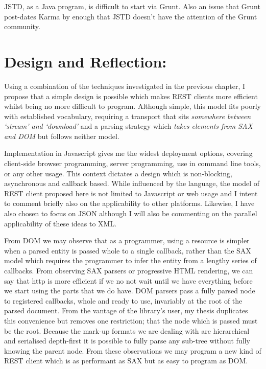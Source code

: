 \documentclass[]{article}
\let\stdsection\section
\renewcommand\section{\newpage\stdsection}
\begin{document}
JSTD, as a Java program, is difficult to start via Grunt. Also an issue
that Grunt post-dates Karma by enough that JSTD doesn't have the
attention of the Grunt community.

\section{Design and Reflection:}

Using a combination of the techniques investigated in the previous
chapter, I propose that a simple design is possible which makes REST
clients more efficient whilst being no more difficult to program.
Although simple, this model fits poorly with established vocabulary,
requiring a transport that sits \emph{somewhere between `stream' and
`download'} and a parsing strategy which \emph{takes elements from SAX
and DOM} but follows neither model.

Implementation in Javascript gives me the widest deployment options,
covering client-side browser programming, server programming, use in
command line tools, or any other usage. This context dictates a design
which is non-blocking, asynchronous and callback based. While influenced
by the language, the model of REST client proposed here is not limited
to Javascript or web usage and I intent to comment briefly also on the
applicability to other platforms. Likewise, I have also chosen to focus
on JSON although I will also be commenting on the parallel applicability
of these ideas to XML.

From DOM we may observe that as a programmer, using a resource is
simpler when a parsed entity is passed whole to a single callback,
rather than the SAX model which requires the programmer to infer the
entity from a lengthy series of callbacks. From observing SAX parsers or
progressive HTML rendering, we can say that http is more efficient if we
no not wait until we have everything before we start using the parts
that we do have. DOM parsers pass a fully parsed node to registered
callbacks, whole and ready to use, invariably at the root of the parsed
document. From the vantage of the library's user, my thesis duplicates
this convenience but removes one restriction; that the node which is
passed must be the root. Because the mark-up formats we are dealing with
are hierarchical and serialised depth-first it is possible to fully
parse any sub-tree without fully knowing the parent node. From these
observations we may program a new kind of REST client which is as
performant as SAX but as easy to program as DOM.
\end{document}
